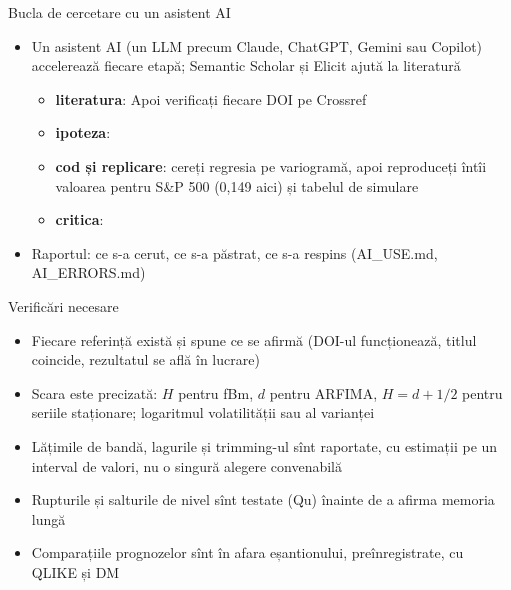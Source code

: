 \begin{frame}{Bucla de cercetare cu un asistent AI}
\itemsize{\footnotesize}
\begin{itemize}
    \item Un asistent AI (un LLM precum Claude, ChatGPT, Gemini sau Copilot) accelerează fiecare etapă; Semantic Scholar și Elicit ajută la literatură
    \begin{itemize}
        \item \textbf{literatura}:  Apoi verificați fiecare DOI pe Crossref
        \item \textbf{ipoteza}: 
        \item \textbf{cod și replicare}: cereți regresia pe variogramă, apoi reproduceți întîi valoarea pentru S\&P 500 (0{,}149 aici) și tabelul de simulare
        \item \textbf{critica}: 
    \end{itemize}
    \item Raportul: ce s-a cerut, ce s-a păstrat, ce s-a respins (AI\_USE.md, AI\_ERRORS.md)
\end{itemize}
\end{frame}

\begin{frame}{Verificări necesare}
\itemsize{\small}
\begin{itemize}
    \item Fiecare referință există și spune ce se afirmă (DOI-ul funcționează, titlul coincide, rezultatul se află în lucrare)
    \item Scara este precizată: $H$ pentru fBm, $d$ pentru ARFIMA, $H = d + 1/2$ pentru seriile staționare; logaritmul volatilității sau al varianței
    \item Lățimile de bandă, lagurile și trimming-ul sînt raportate, cu estimații pe un interval de valori, nu o singură alegere convenabilă
    \item Rupturile și salturile de nivel sînt testate (Qu) înainte de a afirma memoria lungă
    \item Comparațiile prognozelor sînt în afara eșantionului, preînregistrate, cu QLIKE și DM
\end{itemize}
\end{frame}

